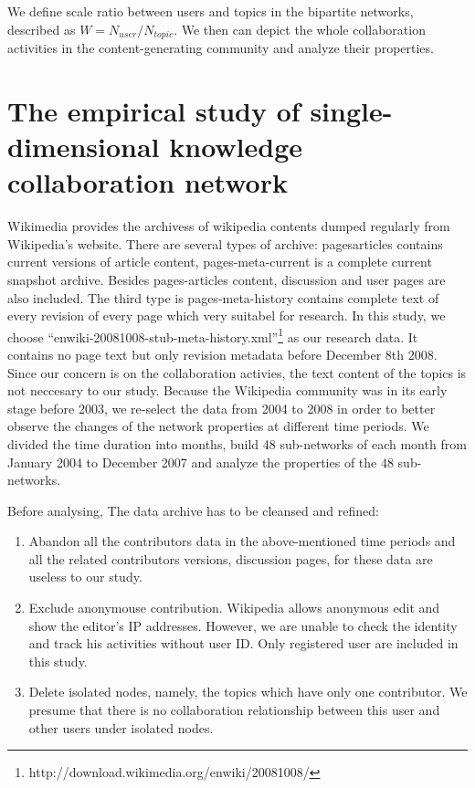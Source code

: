 \documentclass{elsarticle}
\begin{document}
We define scale ratio  between users and topics  in
 the bipartite networks,
 described as
 \begin{math}
 W = N_{user}/N_{topic}   
 \end{math}.
We then can depict the whole collaboration activities in the
content-generating community and analyze their properties.
\section{The empirical study of single-dimensional  knowledge collaboration network}
\label{sec:empir-study-single}
Wikimedia provides the archivess of  wikipedia contents dumped
regularly from
Wikipedia's website.  There are several types of archive: 
pages\nobreakdash{-}articles contains current versions of article content,
pages-meta-current is  a   complete current snapshot archive. Besides pages-articles
content, discussion and user pages are also included.  The third type
is pages-meta-history contains complete text of every revision of
every page which very suitabel  for research.
In this study, we choose
“enwiki-20081008-stub-meta-history.xml”\footnote{http://download.wikimedia.org/enwiki/20081008/} as our research
data. It contains no page text but only revision metadata before
December 8th 2008. Since our concern is on the collaboration activies,
the text content of the topics is not neccesary to our study. Because
the Wikipedia community was in its early stage
 before 2003, we re-select the data from 2004 to 2008 in order to
better observe the changes of the network  properties at different time periods. We divided the time duration into months, build 48 sub-networks of each month from January 2004 to December 2007 and analyze the properties of the 48 sub-networks.

Before analysing, The data archive has to be cleansed and refined:
\begin{enumerate}
\item Abandon all the contributors data in the above-mentioned time
  periods and all the related contributors versions, discussion pages, 
  for these data are useless to our study.
\item Exclude anonymouse contribution. Wikipedia allows anonymous edit
  and show the editor's IP addresses. However, we are unable to check
  the identity and track his activities without user ID. Only
  registered user are included in this study.
\item Delete isolated nodes, namely, the topics which have only one
  contributor. We presume that there is no collaboration relationship
  between this user and other users under isolated nodes.

\end{enumerate}
 
\end{document}
